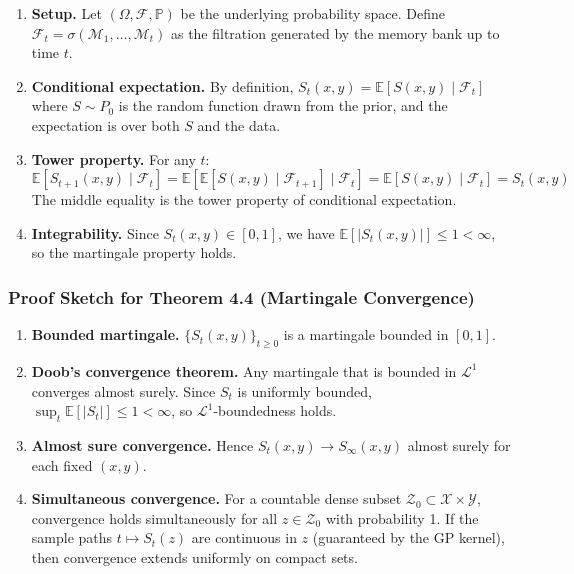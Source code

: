 \documentclass[
  12pt,
]{article}
\begin{document}
\begin{enumerate}
\def\labelenumi{\arabic{enumi}.}
\item
  \textbf{Setup.} Let \((\Omega, \mathcal{F}, \mathbb{P})\) be the
  underlying probability space. Define
  \(\mathcal{F}_t = \sigma(\mathcal{M}_1, \dots, \mathcal{M}_t)\) as the
  filtration generated by the memory bank up to time \(t\).
\item
  \textbf{Conditional expectation.} By definition,
  \(S_t(x,y) = \mathbb{E}[S(x,y) \mid \mathcal{F}_t]\) where
  \(S \sim P_0\) is the random function drawn from the prior, and the
  expectation is over both \(S\) and the data.
\item
  \textbf{Tower property.} For any \(t\): \[
  \mathbb{E}[S_{t+1}(x,y) \mid \mathcal{F}_t] = \mathbb{E}[\mathbb{E}[S(x,y) \mid \mathcal{F}_{t+1}] \mid \mathcal{F}_t] = \mathbb{E}[S(x,y) \mid \mathcal{F}_t] = S_t(x,y)
  \] The middle equality is the tower property of conditional
  expectation.
\item
  \textbf{Integrability.} Since \(S_t(x,y) \in [0,1]\), we have
  \(\mathbb{E}[|S_t(x,y)|] \leq 1 < \infty\), so the martingale property
  holds.
\end{enumerate}

\subsubsection{Proof Sketch for Theorem 4.4 (Martingale
Convergence)}\label{proof-sketch-for-theorem-4.4-martingale-convergence}

\begin{enumerate}
\def\labelenumi{\arabic{enumi}.}
\item
  \textbf{Bounded martingale.} \(\{S_t(x,y)\}_{t \geq 0}\) is a
  martingale bounded in \([0,1]\).
\item
  \textbf{Doob's convergence theorem.} Any martingale that is bounded in
  \(\mathcal{L}^1\) converges almost surely. Since \(S_t\) is uniformly
  bounded, \(\sup_t \mathbb{E}[|S_t|] \leq 1 < \infty\), so
  \(\mathcal{L}^1\)-boundedness holds.
\item
  \textbf{Almost sure convergence.} Hence \(S_t(x,y) \to S_\infty(x,y)\)
  almost surely for each fixed \((x,y)\).
\item
  \textbf{Simultaneous convergence.} For a countable dense subset
  \(\mathcal{Z}_0 \subset \mathcal{X} \times \mathcal{Y}\), convergence
  holds simultaneously for all \(z \in \mathcal{Z}_0\) with probability
  1. If the sample paths \(t \mapsto S_t(z)\) are continuous in \(z\)
  (guaranteed by the GP kernel), then convergence extends uniformly on
  compact sets.
\end{enumerate}
\end{document}
